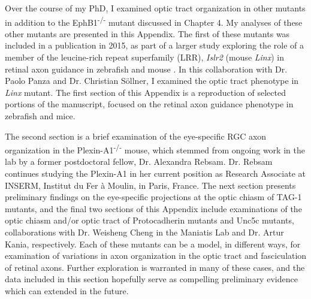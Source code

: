 Over the course of my PhD, I examined optic tract organization in other mutants in addition to the EphB1\textsuperscript{-/-} mutant discussed in Chapter 4.
My analyses of these other mutants are presented in this Appendix.
The first of these mutants was included in a publication in 2015, as part of a larger study exploring the role of a member of the leucine-rich repeat superfamily (LRR), \emph{Islr2} (mouse \emph{Linx}) in retinal axon guidance in zebrafish and mouse \cite{panza2015lrr}.
In this collaboration with Dr. Paolo Panza and Dr. Christian S\"ollner, I examined the optic tract phenotype in \emph{Linx} mutant.
The first section of this Appendix is a reproduction of selected portions of the manuscript, focused on the retinal axon guidance phenotype in zebrafish and mice.

The second section is a brief examination of the eye-specific RGC axon organization in the Plexin-A1\textsuperscript{-/-} mouse, which stemmed from ongoing work in the lab by a former postdoctoral fellow, Dr. Alexandra Rebsam.
Dr. Rebsam continues studying the Plexin-A1 in her current position as Research Associate at INSERM, Institut du Fer \`a Moulin, in Paris, France.
The next section presents preliminary findings on the eye-specific projections at the optic chiasm of TAG-1 mutants, and the final two sections of this Appendix include examinations of the optic chiasm and/or optic tract of Protocadherin mutants and Unc5c mutants, collaborations with Dr. Weisheng Cheng in the Maniatis Lab and Dr. Artur Kania, respectively.
Each of these mutants can be a model, in different ways, for examination of variations in axon organization in the optic tract and fasciculation of retinal axons.
Further exploration is warranted in many of these cases, and the data included in this section hopefully serve as compelling preliminary evidence which can extended in the future.